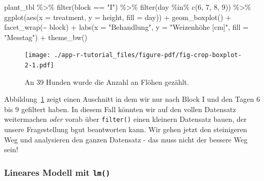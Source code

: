 \documentclass[
  letterpaper,
  DIV=11,
  oneside]{scrreport}
\newenvironment{Shaded}{\begin{snugshade}}{\end{snugshade}}
\newcommand{\AttributeTok}[1]{\textcolor[rgb]{0.40,0.45,0.13}{#1}}
\newcommand{\DecValTok}[1]{\textcolor[rgb]{0.68,0.00,0.00}{#1}}
\newcommand{\FunctionTok}[1]{\textcolor[rgb]{0.28,0.35,0.67}{#1}}
\newcommand{\NormalTok}[1]{\textcolor[rgb]{0.00,0.23,0.31}{#1}}
\newcommand{\SpecialCharTok}[1]{\textcolor[rgb]{0.37,0.37,0.37}{#1}}
\newcommand{\StringTok}[1]{\textcolor[rgb]{0.13,0.47,0.30}{#1}}
\begin{document}
\begin{Shaded}
\begin{Highlighting}[]
\NormalTok{plant\_tbl }\SpecialCharTok{\%\textgreater{}\%} 
  \FunctionTok{filter}\NormalTok{(block }\SpecialCharTok{==} \StringTok{"I"}\NormalTok{) }\SpecialCharTok{\%\textgreater{}\%} 
  \FunctionTok{filter}\NormalTok{(day }\SpecialCharTok{\%in\%} \FunctionTok{c}\NormalTok{(}\DecValTok{6}\NormalTok{, }\DecValTok{7}\NormalTok{, }\DecValTok{8}\NormalTok{, }\DecValTok{9}\NormalTok{)) }\SpecialCharTok{\%\textgreater{}\%} 
  \FunctionTok{ggplot}\NormalTok{(}\FunctionTok{aes}\NormalTok{(}\AttributeTok{x =}\NormalTok{ treatment, }\AttributeTok{y =}\NormalTok{ height, }\AttributeTok{fill =}\NormalTok{ day)) }\SpecialCharTok{+}
  \FunctionTok{geom\_boxplot}\NormalTok{() }\SpecialCharTok{+}
  \FunctionTok{facet\_wrap}\NormalTok{(}\SpecialCharTok{\textasciitilde{}}\NormalTok{ block) }\SpecialCharTok{+}
  \FunctionTok{labs}\NormalTok{(}\AttributeTok{x =} \StringTok{"Behandlung"}\NormalTok{, }\AttributeTok{y =} \StringTok{"Weizenhöhe [cm]"}\NormalTok{, }\AttributeTok{fill =} \StringTok{"Messtag"}\NormalTok{) }\SpecialCharTok{+}
  \FunctionTok{theme\_bw}\NormalTok{()}
\end{Highlighting}
\end{Shaded}

\begin{figure}[H]

{\centering \texttt{[image: ./app-r-tutorial\_files/figure-pdf/fig-crop-boxplot-2-1.pdf]}

}

\caption{\label{fig-crop-boxplot-2}An 39 Hunden wurde die Anzahl an
Flöhen gezählt.}

\end{figure}

Abbildung~\ref{fig-crop-boxplot-2} zeigt einen Auschnitt in dem wir nur
nach Block I und den Tagen 6 bis 9 gefiltert haben. In diesem Fall
könnten wir auf den vollen Datensatz weitermachen \emph{oder} vorab über
\texttt{filter()} einen kleinern Datensatz bauen, der unsere
Fragestellung bgut beantworten kann. Wir gehen jetzt den steinigeren Weg
und analysieren den ganzen Datensatz - das muss nicht der bessere Weg
sein!

\hypertarget{lineares-modell-mit-lm}{%
\subsubsection{\texorpdfstring{Lineares Modell mit
\texttt{lm()}}{Lineares Modell mit lm()}}\label{lineares-modell-mit-lm}}
\end{document}
